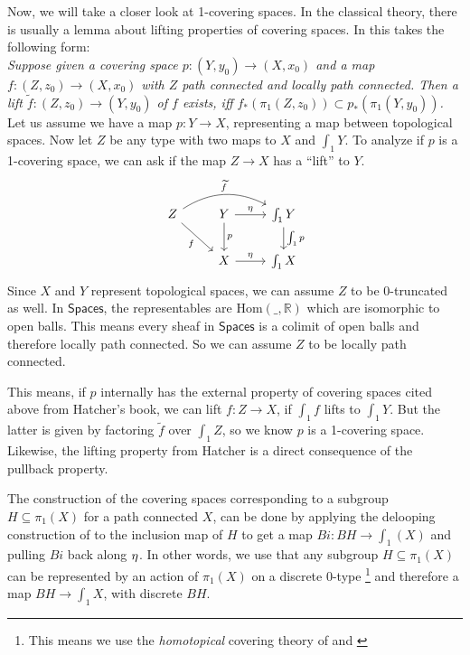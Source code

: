 \documentclass[9pt,twosided]{amsart}
\newcommand{\shape}{\int}
\newcommand{\bR}{\mathbb R}
\newcommand{\Spaces}{\ensuremath{\mathsf{Spaces}}}
\begin{document}
Now, we will take a closer look at 1-covering spaces.
In the classical theory, there is usually a lemma about lifting properties of covering spaces.
In \cite[Proposition 1.33, p. 61]{Hatcher} this takes the following form: \\
\emph{Suppose given a covering space $p:({Y},{y}_0)\to (X,x_0)$ and a map $f:(Z,z_0)\to (X,x_0)$
  with $Z$ path connected and locally path connected.
  Then a lift $\widetilde{f}:(Z,z_0)\to(Y,{y}_0)$ of $f$ exists, iff $f_\ast(\pi_1(Z,z_0))\subset p_\ast(\pi_1({Y},{y}_0))$.} \\
Let us assume we have a map $p:Y\to X$, representing a map between topological spaces.
Now let $Z$ be any type with two maps to $X$ and $\shape_1 Y$.
To analyze if $p$ is a 1-covering space, we can ask if the map $Z\to X$ has a ``lift'' to $Y$.
\begin{equation*}
\begin{tikzcd}
Z\arrow[dr, swap, "f"]\arrow[rr, bend left=30, "\widetilde{f}"]  & Y\arrow[r, "\modalunit"]\arrow[d, "p"] & \shape_1 Y\arrow[d, "\shape_1 p"] \\
& X\arrow[r, "\modalunit"]  & \shape_1 X 
\end{tikzcd}
\end{equation*}
Since $X$ and $Y$ represent topological spaces, we can assume $Z$ to be 0-truncated as well.
In $\Spaces$, the representables are $\mathrm{Hom}(\_,\bR)$ which are isomorphic to open balls.
This means every sheaf in $\Spaces$ is a colimit of open balls and therefore locally path connected. 
So we can assume $Z$ to be locally path connected.

This means, if $p$ internally has the external property of covering spaces cited above from Hatcher's book, we can lift $f:Z\to X$, if $\shape_1 f$ lifts to $\shape_1 Y$.
But the latter is given by factoring $\widetilde{f}$ over $\shape_1 Z$, so we know $p$ is a 1-covering space.
Likewise, the lifting property from Hatcher is a direct consequence of the pullback property. 

The construction of the covering spaces corresponding to a subgroup $H\subseteq \pi_1(X)$ for a path connected $X$,
can be done by applying the delooping construction of \cite{LicataFinster} to the inclusion map of $H$ to get a map $Bi:BH\to\shape_1(X)$ and pulling $Bi$ back along ${\eta_{}}$. In other words, we use that any subgroup $H\subseteq\pi_1(X)$ can be represented by an action of $\pi_1(X)$ on a discrete 0-type
\footnote{This means we use the \emph{homotopical} covering theory of \cite[Section 3.1]{favonia-thesis} 
and \cite[Section 7.1]{ulrik-egbert-floris-groups}}
and therefore a map $BH\to \shape_1X$, with discrete $BH$.
\end{document}
